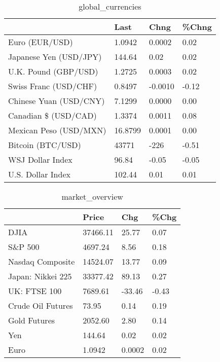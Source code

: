 \documentclass{article}%
\begin{document}
%


\begin{table}[htbp]%
\caption{global\_currencies}%
\centering%
\begin{adjustbox}{width=1\textwidth}%
\begin{tabular}{llll}
\toprule
                       &    Last &    Chng & \%Chng \\
\midrule
        Euro (EUR/USD) &  1.0942 &  0.0002 &  0.02 \\
Japanese Yen (USD/JPY) &  144.64 &    0.02 &  0.02 \\
  U.K. Pound (GBP/USD) &  1.2725 &  0.0003 &  0.02 \\
 Swiss Franc (USD/CHF) &  0.8497 & -0.0010 & -0.12 \\
Chinese Yuan (USD/CNY) &  7.1299 &  0.0000 &  0.00 \\
  Canadian \$ (USD/CAD) &  1.3374 &  0.0011 &  0.08 \\
Mexican Peso (USD/MXN) & 16.8799 &  0.0001 &  0.00 \\
     Bitcoin (BTC/USD) &   43771 &    -226 & -0.51 \\
      WSJ Dollar Index &   96.84 &   -0.05 & -0.05 \\
     U.S. Dollar Index &  102.44 &    0.01 &  0.01 \\
\bottomrule
\end{tabular}
%
\end{adjustbox}%
\end{table}

%


\begin{table}[htbp]%
\caption{market\_overview}%
\centering%
\begin{adjustbox}{width=1\textwidth}%
\begin{tabular}{llll}
\toprule
                  &    Price &    Chg &  \%Chg \\
\midrule
             DJIA & 37466.11 &  25.77 &  0.07 \\
          S\&P 500 &  4697.24 &   8.56 &  0.18 \\
 Nasdaq Composite & 14524.07 &  13.77 &  0.09 \\
Japan: Nikkei 225 & 33377.42 &  89.13 &  0.27 \\
     UK: FTSE 100 &  7689.61 & -33.46 & -0.43 \\
Crude Oil Futures &    73.95 &   0.14 &  0.19 \\
     Gold Futures &  2052.60 &   2.80 &  0.14 \\
              Yen &   144.64 &   0.02 &  0.02 \\
             Euro &   1.0942 & 0.0002 &  0.02 \\
\bottomrule
\end{tabular}
%
\end{adjustbox}%
\end{table}

%
\end{document}
